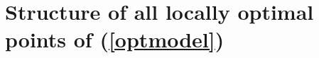 %





 \section{
 Structure   of  all  locally optimal  points of  (\ref{optmodel})
 }
 \label{locallymaximized}


